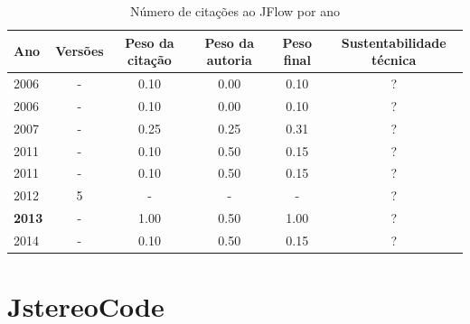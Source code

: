 \begin{table}[H]
\caption{Número de citações ao JFlow por ano}
\centering
\begin{tabular}{| l | c | c | c | c | c |}
  \hline
  Ano & Versões & Peso da citação & Peso da autoria & Peso final & Sustentabilidade técnica \\
  \hline
            2006
          &
          -
          &
          0.10
          &
          0.00
          &
            {\color{red} 0.10}
          &
          ?
          \\
            2006
          &
          -
          &
          0.10
          &
          0.00
          &
            {\color{red} 0.10}
          &
          ?
          \\
\hline
            2007
          &
          -
          &
          0.25
          &
          0.25
          &
            {\color{red} 0.31}
          &
          ?
          \\
\hline
            2011
          &
          -
          &
          0.10
          &
          0.50
          &
            {\color{red} 0.15}
          &
          ?
          \\
            2011
          &
          -
          &
          0.10
          &
          0.50
          &
            {\color{red} 0.15}
          &
          ?
          \\
\hline
        2012 & 5 & - & - & - & ? \\
\hline
            {\bf 2013}
          &
          -
          &
          1.00
          &
          0.50
          &
            {\color{blue} 1.00}
          &
          ?
          \\
\hline
            2014
          &
          -
          &
          0.10
          &
          0.50
          &
            {\color{red} 0.15}
          &
          ?
          \\
\hline
\end{tabular}
\end{table}



\section{JstereoCode}



